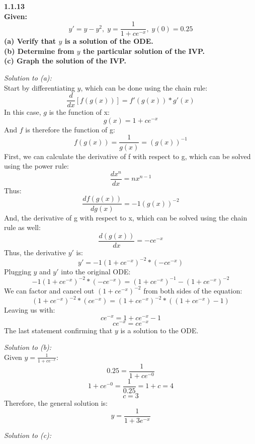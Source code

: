 \documentclass[12pt, letterpaper]{article}
\begin{document}
\setlength\parindent{0pt}
\textbf{
1.1.13\\
Given:
\[ y' = y - y^2,\; y = \frac{1}{1+ce^{-x}},\; y(0) = 0.25 \]
(a) Verify that $y$ is a solution of the ODE.\\
(b) Determine from $y$ the particular solution of the IVP.\\
(c) Graph the solution of the IVP.\\
}

\vspace{5mm}
\textit{Solution to (a):}\\
Start by differentiating $y$, which can be done using the chain rule:
\[ \frac{d}{dx}[f(g(x))] = f'(g(x))*g'(x) \]
In this case, $g$ is the function of x:
\[ g(x) = 1+ce^{-x} \]
And $f$ is therefore the function of g:
\[ f(g(x)) = \frac{1}{g(x)} = (g(x))^{-1} \]
First, we can calculate the derivative of f with respect to g,
which can be solved using the power rule:
\[ \frac{dx^n}{dx} = nx^{n-1} \]
Thus:
\[ \frac{df(g(x))}{dg(x)} = -1(g(x))^{-2} \]
And, the derivative of g with respect to x, which can be solved using the chain
rule as well:
\[ \frac{d(g(x))}{dx} = -ce^{-x} \]
Thus, the derivative $y'$ is:
\[ y' = -1(1+ce^{-x})^{-2}*(-ce^{-x}) \] 
Plugging $y$ and $y'$ into the original ODE:
\[ -1(1+ce^{-x})^{-2}*(-ce^{-x}) = (1+ce^{-x})^{-1} - (1+ce^{-x})^{-2} \] 
We can factor and cancel out $(1+ce^{-x})^{-2}$ from both sides of the equation:
\[ (1+ce^{-x})^{-2}*(ce^{-x}) = (1+ce^{-x})^{-2}*((1+ce^{-x}) - 1) \]
Leaving us with:
\[ ce^{-x} = 1 + ce^{-x} - 1 \]
\[ ce^{-x} = ce^{-x} \]
The last statement confirming that $y$ is a solution to the ODE.

\vspace{5mm}
\textit{Solution to (b):}\\
Given $y = \frac{1}{1+ce^{-x}}$:
\[ 0.25 = \frac{1}{1+ce^{-0}} \]
\[ 1+ce^{-0} = \frac{1}{0.25} = 1 + c = 4 \]
\[ c = 3 \]
Therefore, the general solution is:
\[ y = \frac{1}{1+3e^{-x}} \]

\vspace{5mm}
\textit{Solution to (c):}\\
\end{document}
